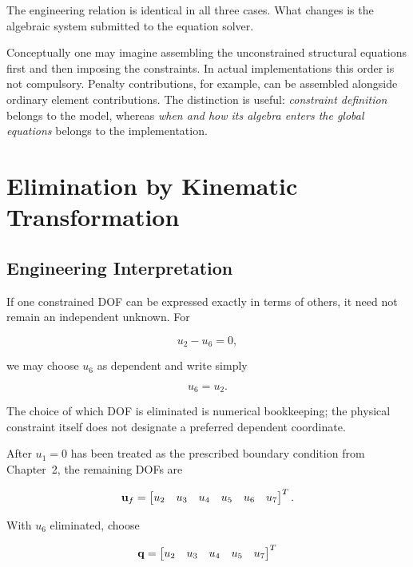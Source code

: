 The engineering relation is identical in all three cases. What changes is the
algebraic system submitted to the equation solver.

Conceptually one may imagine assembling the unconstrained structural equations
first and then imposing the constraints. In actual implementations this order is
not compulsory. Penalty contributions, for example, can be assembled alongside
ordinary element contributions. The distinction is useful: \emph{constraint
definition} belongs to the model, whereas \emph{when and how its algebra enters
the global equations} belongs to the implementation.

\section{Elimination by Kinematic Transformation}\label{sec:mfc-elimination}

\subsection{Engineering Interpretation}

If one constrained DOF can be expressed exactly in terms of others, it need not
remain an independent unknown. For

\begin{equation}
    u_2-u_6=0,
\end{equation}

we may choose $u_6$ as dependent and write simply

\begin{equation}
    u_6=u_2.
\end{equation}

The choice of which DOF is eliminated is numerical bookkeeping; the physical
constraint itself does not designate a preferred dependent coordinate.

After $u_1=0$ has been treated as the prescribed boundary condition from
Chapter~2, the remaining DOFs are

\begin{equation}
    \mathbf{u}_f=
    \begin{bmatrix}u_2&u_3&u_4&u_5&u_6&u_7\end{bmatrix}^T.
\end{equation}

With $u_6$ eliminated, choose

\begin{equation}
    \mathbf{q}=\begin{bmatrix}u_2&u_3&u_4&u_5&u_7\end{bmatrix}^T
\end{equation}

